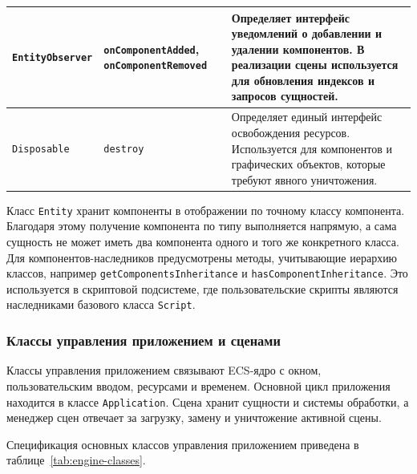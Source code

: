 \begin{xltabular}{\textwidth}{|p{0.22\textwidth}|p{0.26\textwidth}|X|}
\hline
\texttt{EntityObserver} & \texttt{onComponentAdded}, \texttt{onComponentRemoved} & Определяет интерфейс уведомлений о добавлении и удалении компонентов. В реализации сцены используется для обновления индексов и запросов сущностей. \\
\hline
\texttt{Disposable} & \texttt{destroy} & Определяет единый интерфейс освобождения ресурсов. Используется для компонентов и графических объектов, которые требуют явного уничтожения. \\
\hline
\end{xltabular}
\renewcommand{\arraystretch}{1.0}
\endgroup

Класс \texttt{Entity} хранит компоненты в отображении по точному классу
компонента. Благодаря этому получение компонента по типу выполняется напрямую,
а сама сущность не может иметь два компонента одного и того же конкретного
класса. Для компонентов-наследников предусмотрены методы, учитывающие
иерархию классов, например \texttt{getComponentsInheritance} и
\texttt{hasComponentInheritance}. Это используется в скриптовой подсистеме,
где пользовательские скрипты являются наследниками базового класса
\texttt{Script}.

\subsubsection{Классы управления приложением и сценами}

Классы управления приложением связывают ECS-ядро с окном, пользовательским
вводом, ресурсами и временем. Основной цикл приложения находится в классе
\texttt{Application}. Сцена хранит сущности и системы обработки, а менеджер
сцен отвечает за загрузку, замену и уничтожение активной сцены.

Спецификация основных классов управления приложением приведена в
таблице~\ref{tab:engine-classes}.

